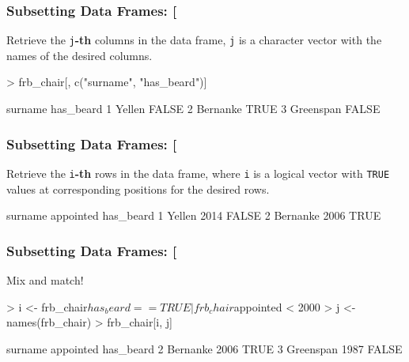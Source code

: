 \documentclass{beamer}
\newcommand{\R}[1]{\texttt{#1}}
\begin{document}
\begin{frame}[fragile]
\frametitle{Subsetting Data Frames: [}

Retrieve the \R{j}\textbf{-th} columns in the data frame, \R{j} is a character vector with the names of the desired columns.

\begin{Schunk}
\begin{Sinput}
> frb_chair[, c("surname", "has_beard")]
\end{Sinput}
\end{Schunk}
\pause
\begin{Schunk}
\begin{Soutput}
    surname has_beard
1    Yellen     FALSE
2  Bernanke      TRUE
3 Greenspan     FALSE
\end{Soutput}
\end{Schunk}
\end{frame}



\begin{frame}[fragile]
\frametitle{Subsetting Data Frames: [}

Retrieve the \R{i}\textbf{-th} rows in the data frame, where \R{i} is a logical vector with \R{TRUE} values at corresponding positions for the desired rows.

\begin{Schunk}
\end{Schunk}
\pause
\begin{Schunk}
\begin{Soutput}
   surname appointed has_beard
1   Yellen      2014     FALSE
2 Bernanke      2006      TRUE
\end{Soutput}
\end{Schunk}
\end{frame}



\begin{frame}[fragile]
\frametitle{Subsetting Data Frames: [}

Mix and match!

\begin{Schunk}
\begin{Sinput}
> i <- frb_chair$has_beard == TRUE | frb_chair$appointed < 2000
> j <- names(frb_chair)
> frb_chair[i, j]
\end{Sinput}
\end{Schunk}
\pause
\begin{Schunk}
\begin{Soutput}
    surname appointed has_beard
2  Bernanke      2006      TRUE
3 Greenspan      1987     FALSE
\end{Soutput}
\end{Schunk}
\end{frame}
\end{document}
